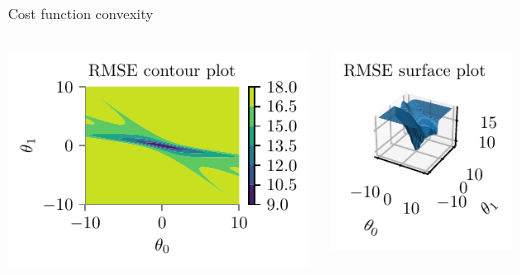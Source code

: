 \documentclass{beamer}
\begin{document}
\begin{frame}{Cost function convexity}
\begin{columns}
	\begin{column}{0.5\textwidth}
		\includegraphics[scale=0.7]{../assets/logistic-regression/figures/logistic-sse-loss-contour.pdf}
	\end{column}
\begin{column}{0.5\textwidth}
	\includegraphics[scale=0.7]{../assets/logistic-regression/figures/logistic-sse-loss-3d.pdf}
\end{column}
\end{columns}
\end{frame}
\end{document}
